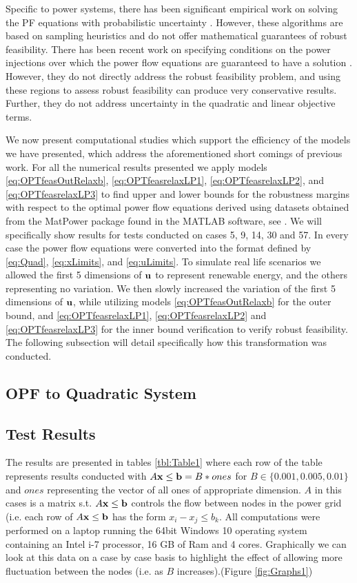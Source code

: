 \documentclass[11pt]{article}
\theoremstyle{plain}
\theoremstyle{definition}
\theoremstyle{remark}
\begin{document}
Specific to power systems, there has been significant empirical work on solving the PF equations with probabilistic uncertainty \cite{morales2007point,wang1992interval}.
However, these algorithms are based on sampling heuristics and do not offer mathematical guarantees of robust feasibility.
There has been recent work on specifying conditions on the power injections over which the power flow equations are guaranteed to have a solution \cite{bolognani2016existence,EPFLA,EPFLB}.
However, they do not directly address the robust feasibility problem, and using these regions to assess robust feasibility can produce very conservative results.
Further, they do not address uncertainty in the quadratic and linear objective terms.

We now present computational studies which support the efficiency of the models we have presented, which address the aforementioned short comings of previous work. 
For all the numerical results presented we apply models \eqref{eq:OPTfeasOutRelaxb}, \eqref{eq:OPTfeasrelaxLP1}, \eqref{eq:OPTfeasrelaxLP2}, and \eqref{eq:OPTfeasrelaxLP3} to find upper and lower bounds for the robustness margins with respect to the optimal power flow equations derived using datasets obtained from the MatPower package found in the MATLAB software, see \cite{matpower}. 
We will specifically show results for tests conducted on cases 5, 9, 14, 30 and 57. 
In every case the power flow equations were converted into the format defined by \eqref{eq:Quad}, \eqref{eq:xLimits}, and \eqref{eq:uLimits}. 
To simulate real life scenarios we allowed the first 5 dimensions of $\bold u$ to represent renewable energy, and the others representing no variation. We then slowly increased the variation of the first 5 dimensions of $\bold u$, while utilizing models \eqref{eq:OPTfeasOutRelaxb} for the outer bound, and \eqref{eq:OPTfeasrelaxLP1}, \eqref{eq:OPTfeasrelaxLP2} and \eqref{eq:OPTfeasrelaxLP3} for the inner bound verification to verify robust feasibility. 
The following subsection will detail specifically how this transformation was conducted.
\subsection*{OPF to Quadratic System}


\subsection*{Test Results}
The results are presented in tables \ref{tbl:Table1} where each row of the table represents results conducted with $A\bold x\leq \bold b = B*ones$ for $B\in\{0.001, 0.005,0.01\}$ and $ones$ representing the vector of all ones of appropriate dimension. 
$A$ in this cases is a matrix s.t. $A\bold x\leq \bold b$ controls the flow between nodes in the power grid (i.e. each row of $A\bold x\leq \bold b$ has the form $x_i-x_j\leq b_k$. 
All computations were performed on a laptop running the 64bit Windows 10 operating system containing an Intel i-7 processor, 16 GB of Ram and 4 cores. 
Graphically we can look at this data on a case by case basis to highlight the effect of allowing more fluctuation between the nodes (i.e. as $B$ increases).(Figure \ref{fig:Graphs1}) 
\end{document}
